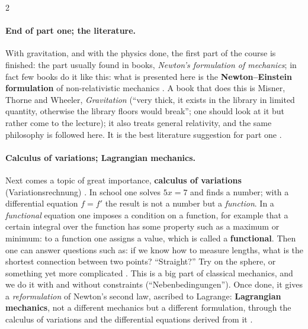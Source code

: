 \begin{paracol}{2}
\paragraph{End of part one; the literature.} With gravitation, and with the physics done, the first part of the course is
finished: the part usually found in books, \emph{Newton's formulation of mechanics}; in fact few books do it like this: what is
presented here is the \textbf{Newton--Einstein formulation} of non-relativistic mechanics .
A book that does this is Misner, Thorne and Wheeler, \emph{Gravitation} (``very thick, it exists in the library in limited
quantity, otherwise the library floors would break''; one should look at it but rather come to the lecture); it also
treats general relativity, and the same philosophy is followed here. It is the best literature suggestion for part one
.

\paragraph{Calculus of variations; Lagrangian mechanics.} Next comes a topic of great importance, \textbf{calculus of
variations} (Variationsrechnung) . In school one solves $5x=7$ and
finds a number; with a differential equation $f=f'$ the result is not a number but a \emph{function}. In a
\emph{functional} equation one imposes a condition on a function, for example that a certain integral over the
function has some property such as a maximum or minimum: to a function one assigns a value, which is called a
\textbf{functional}. Then one can answer questions such as: if we know how to measure lengths, what is the shortest
connection between two points? ``Straight?'' Try on the sphere, or something yet more complicated .
This is a big part of classical mechanics, and we do it with and without constraints (``Nebenbedingungen''). Once done,
it gives a \emph{reformulation} of Newton's second law, ascribed to Lagrange: \textbf{Lagrangian mechanics}, not a
different mechanics but a different formulation, through the calculus of variations and the differential equations
derived from it .


\end{paracol}

